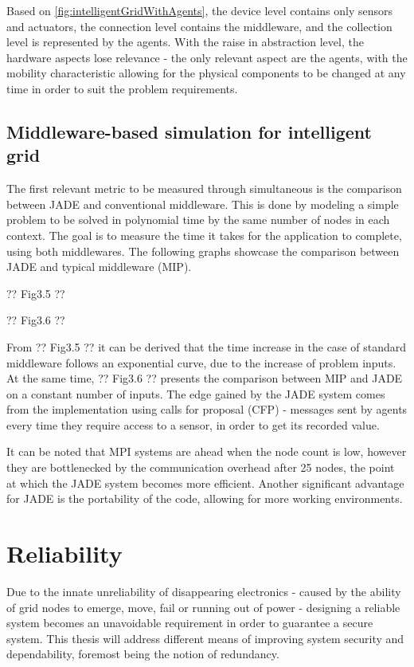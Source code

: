 \documentclass[12pt, english, a4paper]{report}
\begin{document}
Based on \cref{fig:intelligentGridWithAgents}, the device level contains only sensors and actuators, the connection level contains the middleware,
and the collection level is represented by the agents. With the raise in abstraction level, the hardware aspects lose relevance - the only
relevant aspect are the agents, with the mobility characteristic allowing for the physical components to be changed at any time in order
to suit the problem requirements.

\subsection{Middleware-based simulation for intelligent grid}

The first relevant metric to be measured through simultaneous is the comparison between JADE and conventional middleware. This is done by 
modeling a simple problem to be solved in polynomial time by the same number of nodes in each context. The goal is to measure the time
it takes for the application to complete, using both middlewares. The following graphs showcase the comparison between JADE and typical
middleware (MIP).

?? Fig3.5 ??

?? Fig3.6 ??

From ?? Fig3.5 ?? it can be derived that the time increase in the case of standard middleware follows an exponential curve, due to the 
increase of problem inputs. At the same time, ?? Fig3.6 ?? presents the comparison between MIP and JADE on a constant number of inputs.
The edge gained by the JADE system comes from the implementation using calls for proposal (CFP) - messages sent by agents every time they
require access to a sensor, in order to get its recorded value.

It can be noted that MPI systems are ahead when the node count is low, however they are bottlenecked by the communication overhead after
25 nodes, the point at which the JADE system becomes more efficient. Another significant advantage for JADE is the portability of the code,
allowing for more working environments.

\section{Reliability}

Due to the innate unreliability of disappearing electronics - caused by the ability of grid nodes to emerge, move, fail or running out of
power - designing a reliable system becomes an unavoidable requirement in order to guarantee a secure system. This thesis will address different
means of improving system security and dependability, foremost being the notion of redundancy.
\end{document}
